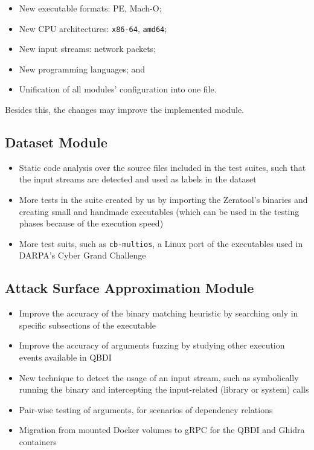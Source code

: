 \documentclass[../main.tex]{subfiles}
\begin{document}
\begin{itemize}
  \tightlist
  \item
        New executable formats: PE, Mach-O;
  \item
        New CPU architectures: \texttt{x86-64}, \texttt{amd64};
  \item
        New input streams: network packets;
  \item
        New programming languages; and
  \item
        Unification of all modules' configuration into one file.
\end{itemize}

Besides this, the changes may improve the implemented module.

\hypertarget{dataset-module}{%
  \subsection{Dataset Module}\label{future-dataset-module}}

\begin{itemize}
  \tightlist
  \item
        Static code analysis over the source files included in the test
        suites, such that the input streams are detected and used as labels in
        the dataset
  \item
        More tests in the suite created by us by importing the Zeratool's
        binaries and creating small and handmade executables (which can be
        used in the testing phases because of the execution speed)
  \item
        More test suits, such as \texttt{cb-multios}, a Linux port of
        the executables used in DARPA's Cyber Grand Challenge
\end{itemize}

\hypertarget{attack-surface-approximation-module}{%
  \subsection{Attack Surface Approximation
    Module}\label{attack-surface-approximation-module}}

\begin{itemize}
  \tightlist
  \item
        Improve the accuracy of the binary matching heuristic by searching
        only in specific subsections of the executable
  \item
        Improve the accuracy of arguments fuzzing by studying other execution
        events available in QBDI
  \item
        New technique to detect the usage of an input stream, such as
        symbolically running the binary and intercepting the input-related
        (library or system) calls
  \item
        Pair-wise testing of arguments, for scenarios of dependency relations
  \item
        Migration from mounted Docker volumes to gRPC for the QBDI and Ghidra
        containers
\end{itemize}
\end{document}
